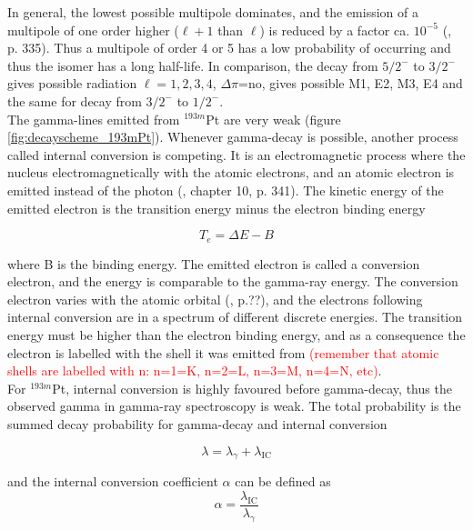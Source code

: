 In general, the lowest possible multipole dominates, and the emission of a multipole of one order higher  ($\ell+1$ than $\ell$) is reduced by a factor ca. $10^{-5}$ (\cite{KraneKennethS.Halliday1987}, p. 335). Thus a multipole of order 4 or 5 has a low probability of occurring and thus the isomer has a long half-life. In comparison, the decay from $5/2^-$ to $3/2^-$ gives possible radiation $\ell=1,2,3,4$, $\Delta\pi$=no, gives possible M1, E2, M3, E4 and the same for decay from $3/2^-$ to $1/2^-$. \\

The gamma-lines emitted from $^{193m}$Pt are very weak (figure \ref{fig:decayscheme_193mPt}). Whenever gamma-decay is possible, another process called internal conversion is competing. It is an electromagnetic process where the nucleus electromagnetically with the atomic electrons, and an atomic electron is emitted instead of the photon (\cite{KraneKennethS.Halliday1987}, chapter 10, p. 341). The kinetic energy of the emitted electron is the transition energy minus the electron binding energy 

\begin{equation}
    T_e = \Delta E -B
\end{equation}

where B is the binding energy. The emitted electron is called a conversion electron, and the energy is comparable to the gamma-ray energy. The conversion electron varies with the atomic orbital (\cite{KraneKennethS.Halliday1987}, p.??), and the electrons following internal conversion are in a spectrum of different discrete energies. The transition energy must be higher than the electron binding energy, and as a consequence the electron is labelled with the shell it was emitted from \textcolor{red}{(remember that atomic shells are labelled with n: n=1=K, n=2=L, n=3=M, n=4=N, etc)}. \\

\noindent 
For $^{193m}$Pt, internal conversion is highly favoured before gamma-decay, thus the observed gamma in gamma-ray spectroscopy is weak. The total probability is the summed decay probability for gamma-decay and internal conversion 

\begin{equation}
    \lambda = \lambda_\gamma + \lambda_\text{IC}
\end{equation}

and the internal conversion coefficient $\alpha$ can be defined as 
\begin{equation}
    \alpha = \frac{\lambda_\text{IC}}{\lambda_\gamma}
\end{equation}

